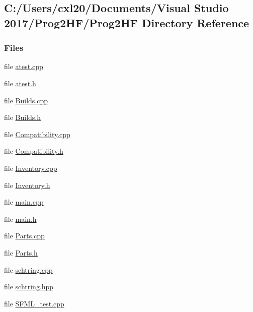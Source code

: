 \subsection{C\+:/\+Users/cxl20/\+Documents/\+Visual Studio 2017/\+Prog2\+H\+F/\+Prog2\+HF Directory Reference}
\label{dir_9ff55877543f9a223593c71c8b414f4c}
\subsubsection*{Files}
\begin{DoxyCompactItemize}
\item 
file \mbox{\hyperlink{atest_8cpp}{atest.\+cpp}}
\item 
file \mbox{\hyperlink{atest_8h}{atest.\+h}}
\item 
file \mbox{\hyperlink{_builds_8cpp}{Builds.\+cpp}}
\item 
file \mbox{\hyperlink{_builds_8h}{Builds.\+h}}
\item 
file \mbox{\hyperlink{_compatibility_8cpp}{Compatibility.\+cpp}}
\item 
file \mbox{\hyperlink{_compatibility_8h}{Compatibility.\+h}}
\item 
file \mbox{\hyperlink{_inventory_8cpp}{Inventory.\+cpp}}
\item 
file \mbox{\hyperlink{_inventory_8h}{Inventory.\+h}}
\item 
file \mbox{\hyperlink{main_8cpp}{main.\+cpp}}
\item 
file \mbox{\hyperlink{main_8h}{main.\+h}}
\item 
file \mbox{\hyperlink{_parts_8cpp}{Parts.\+cpp}}
\item 
file \mbox{\hyperlink{_parts_8h}{Parts.\+h}}
\item 
file \mbox{\hyperlink{schtring_8cpp}{schtring.\+cpp}}
\item 
file \mbox{\hyperlink{schtring_8hpp}{schtring.\+hpp}}
\item 
file \mbox{\hyperlink{_s_f_m_l__test_8cpp}{S\+F\+M\+L\+\_\+test.\+cpp}}
\end{DoxyCompactItemize}
